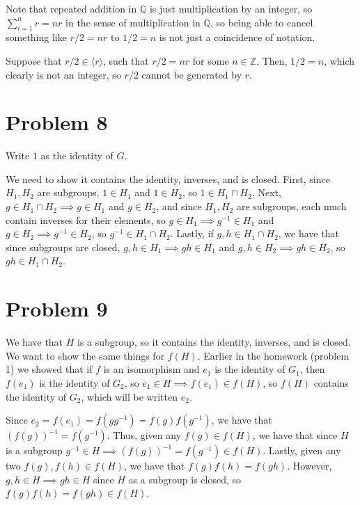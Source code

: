 \documentclass[12pt,letterpaper]{article}
\theoremstyle{definition}
\newcommand{\Z}{\mathbb{Z}}
\newcommand{\Q}{\mathbb{Q}}
\begin{document}
Note that repeated addition in $\Q$ is just multiplication by an integer, so $\sum_{i=1}^{n}r = nr$ in the sense of multiplication in $\Q$, so being able to cancel something like $r/2 = nr$ to $1/2 = n$ is not just a coincidence of notation.

Suppose that $r/2 \in \langle r \rangle$, such that $r/2 = nr$ for some $n \in \Z$. Then, $1/2 = n$, which clearly is not an integer, so $r/2$ cannot be generated by $r$.

\section*{Problem 8}

Write $1$ as the identity of $G$.

We need to show it contains the identity, inverses, and is closed. First, since $H_{1}, H_{2}$ are subgroups, $1 \in H_{1}$ and $1 \in H_{2}$, so $1 \in H_{1} \cap H_{2}$. Next, $g \in H_{1} \cap H_{2} \implies g \in H_{1}$ and $g \in H_{2}$, and since $H_{1}, H_{2}$ are subgroups, each much contain inverses for their elements, so $g \in H_{1} \implies g^{-1} \in H_{1}$ and $g \in H_{2} \implies g^{-1} \in H_{2}$, so $g^{-1} \in H_{1} \cap H_{2}$. Lastly, if $g, h \in H_{1} \cap H_{2}$, we have that since subgroups are closed, $g,h \in H_{1} \implies gh \in H_{1}$ and $g,h \in H_{2} \implies gh \in H_{2}$, so $gh \in H_{1} \cap H_{2}$.

\section*{Problem 9}

We have that $H$ is a subgroup, so it contains the identity, inverses, and is closed. We want to show the same things for $f(H)$. Earlier in the homework (problem 1) we showed that if $f$ is an isomorphism and $e_{1}$ is the identity of $G_{1}$, then $f(e_{1})$ is the identity of $G_{2}$, so $e_{1} \in H \implies f(e_{1}) \in f(H)$, so $f(H)$ contains the identity of $G_{2}$, which will be written $e_{2}$.

Since $e_{2} = f(e_{1}) = f(g  g^{-1}) = f(g)  f(g^{-1})$, we have that $(f(g))^{-1} = f(g^{-1})$. Thus, given any $f(g) \in f(H)$, we have that since $H$ is a subgroup $g^{-1} \in H \implies (f(g))^{-1} = f(g^{-1}) \in f(H)$. Lastly, given any two $f(g), f(h) \in f(H)$, we have that $f(g) f(h) = f(g  h)$. However, $g, h \in H \implies gh \in H$ since $H$ as a subgroup is closed, so $f(g) f(h) = f(g  h) \in f(H)$.
\end{document}
